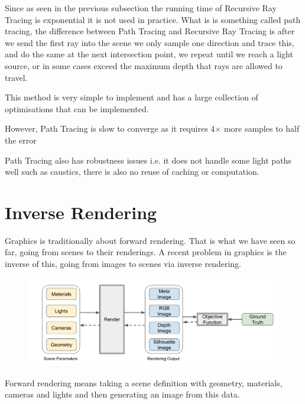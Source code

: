 \documentclass{article}
\begin{document}
Since as seen in the previous subsection the running time of Recursive Ray Tracing is exponential it is not used in practice. What is
is something called path tracing, the difference between Path Tracing and Recursive Ray Tracing is after we send the first ray into the scene
we only sample one direction and trace this, and do the same at the next intersection point, we repeat until we reach a light source, or in some
cases exceed the maximum depth that rays are allowed to travel.

\vspace{10px}

This method is very simple to implement and has a large collection of optimisations that can be implemented.

\vspace{5px}

However, Path Tracing is slow to converge as it requires 4\(\times\) more samples to half the error

\vspace{5px}

Path Tracing also has robustness issues i.e. it does not handle some light paths well such as caustics, there is also no reuse of caching or computation.


\newpage

\section{Inverse Rendering}

Graphics is traditionally about forward rendering. That is what we have seen so far, going from scenes to their renderings. A
recent problem in graphics is the inverse of this, going from images to scenes via inverse rendering.

\begin{figure}[!ht]
    \centering
    \includegraphics[width=0.9\linewidth]{images/inverse_rendering.png}
\end{figure}

Forward rendering means taking a scene definition with geometry, materials, cameras and lights and then generating an image
from this data.
\end{document}
